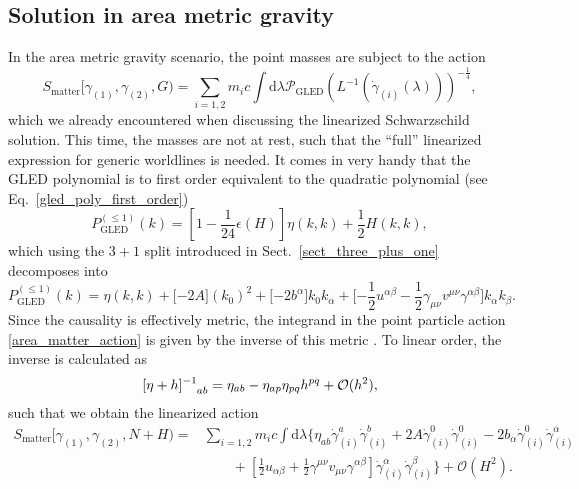 \subsection{Solution in area metric gravity}
In the area metric gravity scenario, the point masses are subject to the action
\begin{equation}\label{area_matter_action}
  S_\text{matter}\lbrack\gamma_{(1)},\gamma_{(2)},G) = \sum_{i=1,2} m_i c\int\mathrm d\lambda \mathcal P_\text{GLED}(L^{-1}(\dot\gamma_{(i)}(\lambda)))^{-\frac{1}{4}},
\end{equation}
which we already encountered when discussing the linearized Schwarzschild solution. This time, the masses are not at rest, such that the ``full'' linearized expression for generic worldlines is needed. It comes in very handy that the GLED polynomial is to first order equivalent to the quadratic polynomial (see Eq.~\eqref{gled_poly_first_order})
\begin{equation}
  P^{(\leq 1)}_\text{GLED}(k) = [1-\frac{1}{24}\epsilon(H)] \eta(k,k) + \frac{1}{2} H(k,k),
\end{equation}
which using the $3+1$ split introduced in Sect.~\ref{sect_three_plus_one} decomposes into
\begin{equation}\label{area_metric_linearized_poly}
    P^{(\leq 1)}_\text{GLED}(k) = \eta(k,k) + \lbrack -2A\rbrack (k_0)^2 + \lbrack -2b^\alpha\rbrack k_0 k_\alpha + \lbrack -\frac{1}{2} u^{\alpha\beta} - \frac{1}{2} \gamma_{\mu\nu} v^{\mu\nu} \gamma^{\alpha\beta} \rbrack k_\alpha k_\beta.
\end{equation}
Since the causality is effectively metric, the integrand in the point particle action \eqref{area_matter_action} is given by the inverse of this metric \cite{R_tzel_2011,Rivera_2012}. To linear order, the inverse is calculated as
\begin{equation}\label{area_matter_linearized_poly}
  \lbrack\eta + h\rbrack^{-1}_{\hphantom{-1}ab} = \eta_{ab} - \eta_{ap}\eta_{pq} h^{pq} + \mathcal O(h^2),
\end{equation}
such that we obtain the linearized action
\begin{equation}\label{area_linearized_matter_action}
  \begin{aligned}
    S_\text{matter}\lbrack\gamma_{(1)},\gamma_{(2)},N+H) = {} & \sum_{i=1,2} m_i c\int\mathrm d\lambda \Big\{ \eta_{ab}\dot\gamma^a_{(i)}\dot\gamma^b_{(i)} + 2A\dot\gamma^0_{(i)}\dot\gamma^0_{(i)} - 2b_\alpha\dot\gamma^0_{(i)}\dot\gamma^\alpha_{(i)} \\
    {} & \quad\quad + \left\lbrack\frac{1}{2}u_{\alpha\beta} + \frac{1}{2}\gamma^{\mu\nu}v_{\mu\nu}\gamma^{\alpha\beta}\right\rbrack \dot\gamma^\alpha_{(i)} \dot\gamma^\beta_{(i)} \Big\} + \mathcal O(H^2).
  \end{aligned}
\end{equation}

